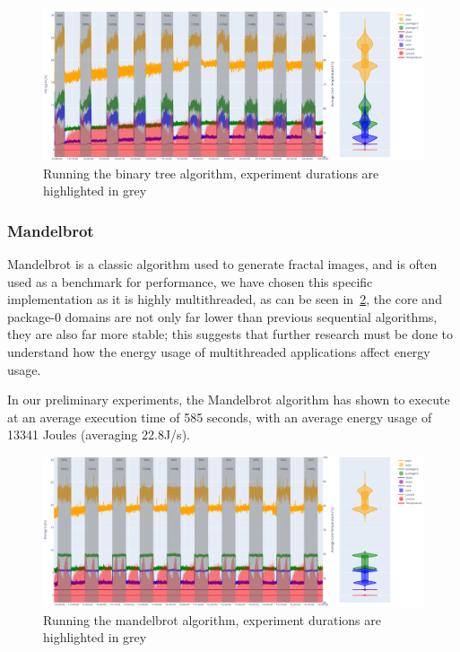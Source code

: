\begin{figure}[H]
    \centering
    \includegraphics[width=15cm]{figures/implementation/btree_repeating}
    \caption{Running the binary tree algorithm, experiment durations are highlighted in grey}
    \label{fig:btree_repeating}
\end{figure}

\subsubsection{Mandelbrot}
Mandelbrot is a classic algorithm used to generate fractal images, and is often used as a benchmark for performance, we
have chosen this specific implementation as it is highly multithreaded, as can be seen in~\ref{fig:mandelbrot_repeating},
the core and package-0 domains are not only far lower than previous sequential algorithms, they are also far more stable;
this suggests that further research must be done to understand how the energy usage of multithreaded applications
affect energy usage.

In our preliminary experiments, the Mandelbrot algorithm has shown to execute at an average execution time of 585
seconds, with an average energy usage of 13341 Joules (averaging 22.8J/s).

\begin{figure}[H]
    \centering
    \includegraphics[width=15cm]{figures/implementation/mandelbrot_repeating}
    \caption{Running the mandelbrot algorithm, experiment durations are highlighted in grey}
    \label{fig:mandelbrot_repeating}
\end{figure}

